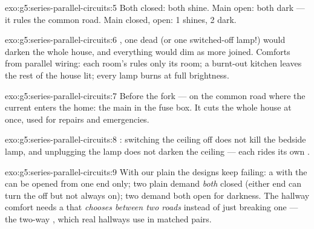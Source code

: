 \begin{solution}{exo:g5:series-parallel-circuits:5}
Both closed: both  shine. Main open: both dark --- it rules
the common road. Main closed,   open:  1 shines,
 2 dark.
\end{solution}

\begin{solution}{exo:g5:series-parallel-circuits:6}
, one dead  (or one switched-off lamp!) would darken
the whole house, and everything would dim as more  joined.
Comforts from parallel wiring: each room's  rules only its
room; a burnt-out kitchen  leaves the rest of the house lit;
every lamp burns at full brightness.
\end{solution}

\begin{solution}{exo:g5:series-parallel-circuits:7}
Before the fork --- on the common road where the current enters the
home: the main  in the fuse box. It cuts the whole house at
once, used for repairs and emergencies.
\end{solution}

\begin{solution}{exo:g5:series-parallel-circuits:8}
: switching the ceiling  off does not kill the
bedside lamp, and unplugging the lamp does not darken the ceiling
--- each rides its own .
\end{solution}

\begin{solution}{exo:g5:series-parallel-circuits:9}
With our plain  the designs keep failing: a   with the  can be opened from one end only; two plain
  demand \emph{both} closed (either end can turn
the  off but not always on); two  demand both open
for darkness. The hallway comfort needs a  that \emph{chooses
between two roads} instead of just breaking one --- the two-way
, which real hallways use in matched pairs.
\end{solution}

